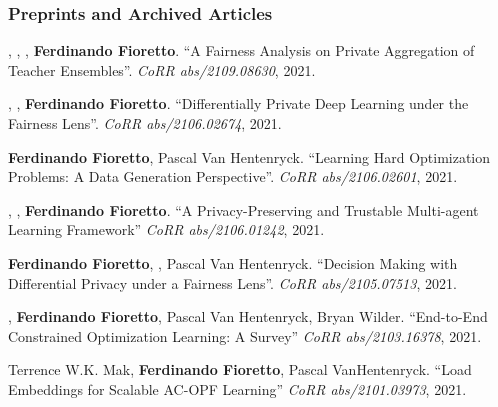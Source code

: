 
\subsubsection*{\sc Preprints and Archived Articles}%

\renewcommand{\labelenumi}{i\theenumi.} 
\beginEnum
\item {}, , , {\bf Ferdinando Fioretto}.
	{``A Fairness Analysis on Private Aggregation of Teacher Ensembles''}.
	\emph{CoRR abs/2109.08630}, 2021.

\item {}, , {\bf Ferdinando Fioretto}.
	{``Differentially Private Deep Learning under the Fairness Lens''}. 
	\emph{CoRR abs/2106.02674}, 2021.

\item {} {\bf Ferdinando Fioretto}, Pascal Van Hentenryck.
	{``Learning Hard Optimization Problems: A Data Generation Perspective''}. 
	\emph{CoRR abs/2106.02601}, 2021.

\item {}, , {\bf Ferdinando Fioretto}. 
{``A Privacy-Preserving and Trustable Multi-agent Learning Framework''}
\emph{CoRR abs/2106.01242}, 2021.


\item {\bf Ferdinando Fioretto}, , Pascal Van Hentenryck.
	{``Decision Making with Differential Privacy under a Fairness Lens''}. 
	\emph{CoRR abs/2105.07513}, 2021.


\item {}, {\bf Ferdinando Fioretto}, Pascal Van Hentenryck, Bryan Wilder.
{``End-to-End Constrained Optimization Learning: A Survey''}
\emph{CoRR abs/2103.16378}, 2021.

\item Terrence W.K. Mak, {\bf Ferdinando Fioretto}, Pascal VanHentenryck.
{``Load Embeddings for Scalable AC-OPF Learning''}
\emph{CoRR abs/2101.03973}, 2021.

